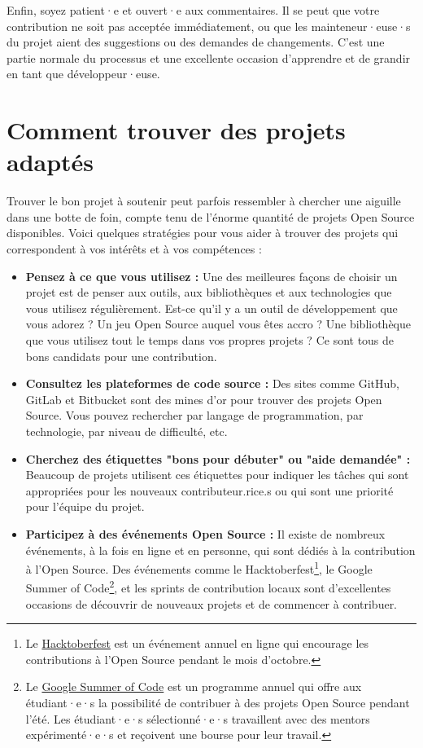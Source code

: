Enfin, soyez patient·e et ouvert·e aux commentaires. Il se peut que votre contribution ne soit pas acceptée immédiatement, ou que les mainteneur·euse·s du projet aient des suggestions ou des demandes de changements. C'est une partie normale du processus et une excellente occasion d'apprendre et de grandir en tant que développeur·euse.


\section{Comment trouver des projets adaptés}

Trouver le bon projet à soutenir peut parfois ressembler à chercher une aiguille dans une botte de foin, compte tenu de l'énorme quantité de projets Open Source disponibles. Voici quelques stratégies pour vous aider à trouver des projets qui correspondent à vos intérêts et à vos compétences :

\begin{itemize}
    \item \textbf{Pensez à ce que vous utilisez :} Une des meilleures façons de choisir un projet est de penser aux outils, aux bibliothèques et aux technologies que vous utilisez régulièrement. Est-ce qu'il y a un outil de développement que vous adorez ? Un jeu Open Source auquel vous êtes accro ? Une bibliothèque que vous utilisez tout le temps dans vos propres projets ? Ce sont tous de bons candidats pour une contribution.

    \item \textbf{Consultez les plateformes de code source :} Des sites comme GitHub, GitLab et Bitbucket sont des mines d'or pour trouver des projets Open Source. Vous pouvez rechercher par langage de programmation, par technologie, par niveau de difficulté, etc.

    \item \textbf{Cherchez des étiquettes "bons pour débuter" ou "aide demandée" :} Beaucoup de projets utilisent ces étiquettes pour indiquer les tâches qui sont appropriées pour les nouveaux contributeur.rice.s ou qui sont une priorité pour l'équipe du projet.

    \item \textbf{Participez à des événements Open Source :} Il existe de nombreux événements, à la fois en ligne et en personne, qui sont dédiés à la contribution à l'Open Source. Des événements comme le Hacktoberfest\footnote{Le \textcolor{blue}{\href{https://hacktoberfest.digitalocean.com/}{Hacktoberfest}} est un événement annuel en ligne qui encourage les contributions à l'Open Source pendant le mois d'octobre.}, le Google Summer of Code\footnote{Le \textcolor{blue}{\href{https://summerofcode.withgoogle.com/}{Google Summer of Code}} est un programme annuel qui offre aux étudiant·e·s la possibilité de contribuer à des projets Open Source pendant l'été. Les étudiant·e·s sélectionné·e·s travaillent avec des mentors expérimenté·e·s et reçoivent une bourse pour leur travail.}, et les sprints de contribution locaux sont d'excellentes occasions de découvrir de nouveaux projets et de commencer à contribuer.

\end{itemize}

